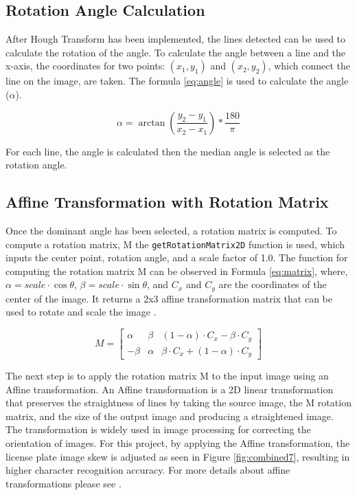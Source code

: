 \documentclass[conference]{IEEEtran}
\begin{document}
\subsection{Rotation Angle Calculation}

After Hough Transform has been implemented, the lines detected can be used to calculate the rotation of the angle. To calculate the angle between a line and the x-axis, the coordinates for two points: $(x_1, y_1)$ and $(x_2, y_2)$, which connect the line on the image, are taken. The formula \ref{eq:angle} is used to calculate the angle ($\alpha$). 

\begin{equation}
    \alpha = \arctan\left(\frac{y_2-y_1}{x_2-x_1}\right) * \frac{180}{\pi}
    \label{eq:angle}
\end{equation}

For each line, the angle is calculated then the median angle is selected as the rotation angle.

\subsection{Affine Transformation with Rotation Matrix}

Once the dominant angle has been selected, a rotation matrix is computed. To compute a rotation matrix, M the \texttt{getRotationMatrix2D} function is used, which inputs the center point, rotation angle, and a scale factor of 1.0. The function for computing the rotation matrix M can be observed in Formula \ref{eq:matrix}, where, $\alpha = scale \cdot \cos{\theta}$, $\beta = scale \cdot \sin{\theta}$, and $C_x$ and $C_y$ are the coordinates of the center of the image. It returns a 2x3 affine transformation matrix that can be used to rotate and scale the image \cite{b16}.  

\begin{equation}
    M = \begin{bmatrix}
        \alpha & \beta & (1-\alpha) \cdot C_x - \beta \cdot C_y\\
        -\beta & \alpha & \beta \cdot C_x + (1-\alpha) \cdot C_y
    \end{bmatrix}
    \label{eq:matrix}
\end{equation}

The next step is to apply the rotation matrix M to the input image using an Affine transformation. An Affine transformation is a 2D linear transformation that preserves the straightness of lines by taking the source image, the M rotation matrix, and the size of the output image and producing a straightened image. The transformation is widely used in image processing for correcting the orientation of images. For this project, by applying the Affine transformation, the license plate image skew is adjusted as seen in Figure \ref{fig:combined7}, resulting in higher character recognition accuracy. For more details about affine transformations please see \cite{b17}.
\end{document}
